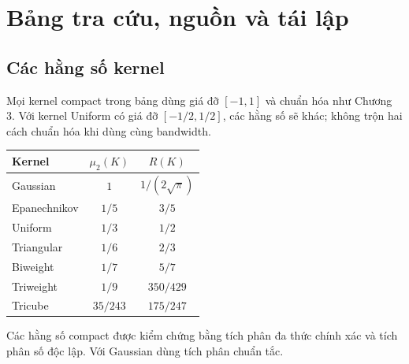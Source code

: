 \chapter{Bảng tra cứu, nguồn và tái lập}\label{app:reference}
\section{Các hằng số kernel}
Mọi kernel compact trong bảng dùng giá đỡ $[-1,1]$ và chuẩn hóa như
Chương 3. Với kernel Uniform có giá đỡ $[-1/2,1/2]$, các hằng số sẽ
khác; không trộn hai cách chuẩn hóa khi dùng cùng bandwidth.
\begin{center}
\begin{tabular}{lcc}
\toprule Kernel & $\mu_2(K)$ & $R(K)$\\\midrule
Gaussian & $1$ & $1/(2\sqrt\pi)$\\
Epanechnikov & $1/5$ & $3/5$\\
Uniform & $1/3$ & $1/2$\\
Triangular & $1/6$ & $2/3$\\
Biweight & $1/7$ & $5/7$\\
Triweight & $1/9$ & $350/429$\\
Tricube & $35/243$ & $175/247$\\\bottomrule
\end{tabular}
\end{center}
Các hằng số compact được kiểm chứng bằng tích phân đa thức chính xác
và tích phân số độc lập. Với Gaussian dùng tích phân chuẩn tắc.

